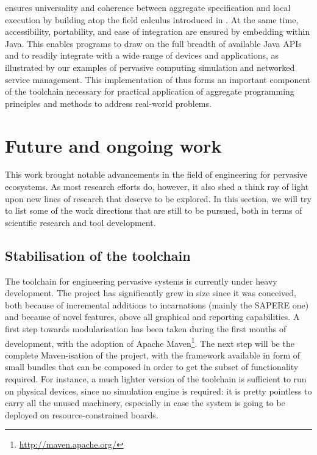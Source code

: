\documentclass[12pt,a4paper,twoside,openright]{book}
\begin{document}
\protelis{} ensures universality and coherence between aggregate specification and local execution by building atop the field calculus introduced in \cite{VDB-FOCLASA-CIC2013}.
%
At the same time, accessibility, portability, and ease of integration are ensured by embedding \protelis{} within Java.
%
This enables \protelis{} programs to draw on the full breadth of available Java APIs and to readily integrate with a wide range of devices and applications, as illustrated by our examples of pervasive computing simulation and networked service management.
%
This implementation of \protelis{} thus forms an important component of the toolchain necessary for practical application of aggregate programming principles and methods to address real-world problems.

\section{Future and ongoing work}

This work brought notable advancements in the field of engineering for pervasive ecosystems.
%
As most research efforts do, however, it also shed a think ray of light upon new lines of research that deserve to be explored.
%
In this section, we will try to list some of the work directions that are still to be pursued, both in terms of scientific research and tool development.

\subsection{Stabilisation of the toolchain}

The \alchemist{} toolchain for engineering pervasive systems is currently under heavy development.
%
The project has significantly grew in size since it was conceived, both because of incremental additions to incarnations (mainly the SAPERE one) and because of novel features, above all graphical and reporting capabilities.
%
A first step towards modularisation has been taken during the first months of development, with the adoption of Apache Maven\footnote{\url{http://maven.apache.org/}}.
%
The next step will be the complete Maven-isation of the project, with the framework available in form of small bundles that can be composed in order to get the subset of functionality required.
%
For instance, a much lighter version of the toolchain is sufficient to run \protelis{} on physical devices, since no simulation engine is required: it is pretty pointless to carry all the unused machinery, especially in case the system is going to be deployed on resource-constrained boards.
\end{document}
